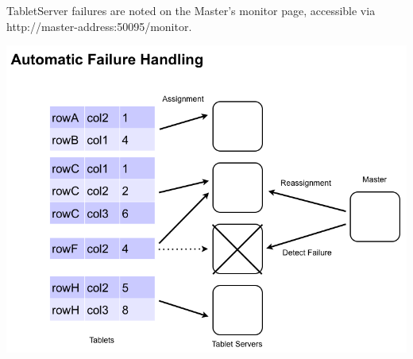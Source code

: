 TabletServer failures are noted on the Master's monitor page, accessible via\\
\mbox{http://master-address:50095/monitor}.

\begin{center}
\includegraphics[scale=0.4]{images/failure_handling.png}
\end{center}


